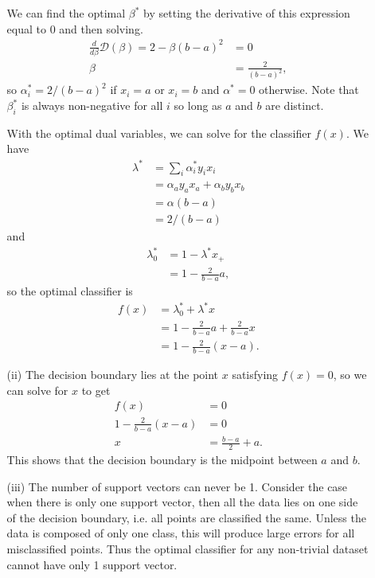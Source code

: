 \documentclass{article}
\begin{document}
\begin{enumerate}
\begin{enumerate}
		We can find the optimal $\beta^*$ by setting the derivative of this expression equal to 0 and then solving.
		\begin{align*}
			\frac{d }{d \beta} \mathcal{D}(\beta) = 2 - \beta(b-a)^2 &= 0 \\
			\beta &= \frac{2}{(b-a)^2},
		\end{align*}
		so $\alpha_i^* = 2/(b-a)^2$ if $x_i = a$ or $x_i = b$ and $\alpha^* = 0$ otherwise. Note that $\beta_i^*$ is always non-negative for all $i$ so long as $a$ and $b$ are distinct.

		With the optimal dual variables, we can solve for the classifier $f(x)$. We have
		\begin{align*}
			\lambda^* &= \sum_{i} \alpha_i^* y_i x_i \\
				  &= \alpha_a y_a x_a + \alpha_b y_b x_b \\
				  &= \alpha(b-a) \\
				  &= 2/(b-a)
		\end{align*}
		and
		\begin{align*}
			\lambda_0^* &= 1- \lambda^* x_+ \\
				    &= 1 - \frac{2}{b-a} a,
		\end{align*}
		so the optimal classifier is
		\begin{align*}
			f(x) &= \lambda_0^* + \lambda^* x \\
			     &= 1 - \frac{2}{b-a} a + \frac{2}{b-a} x \\
			     &= 1 - \frac{2}{b-a} (x-a).
		\end{align*}

	\item[(ii)]
		The decision boundary lies at the point $x$ satisfying $f(x)=0$, so we can solve for $x$ to get
		\begin{align*}
			f(x) &= 0 \\
			1 - \frac{2}{b-a} (x-a) &= 0 \\
			x &= \frac{b-a}{2} +a.
		\end{align*}
		This shows that the decision boundary is the midpoint between $a$ and $b$.

	\item[(iii)]
		The number of support vectors can never be 1. Consider the case when there is only one support vector, then all the data lies on one side of the decision boundary, i.e. all points are classified the same. Unless the data is composed of only one class, this will produce large errors for all misclassified points. Thus the optimal classifier for any non-trivial dataset cannot have only 1 support vector.
	\end{enumerate}


\end{enumerate}
\end{document}
